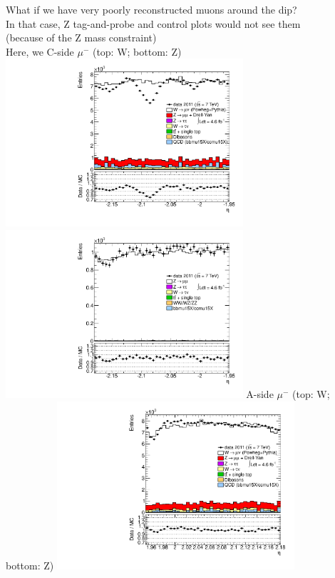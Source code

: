  {
What if we have very poorly reconstructed muons around the dip? \\
In that case, Z tag-and-probe and control plots would not see them \\
(because of the Z mass constraint) \\
Here, we 
}
 {
\colb[T]
C-side $\mu^{-}$ (top: W; bottom: Z)
\centering
\includegraphics[width=0.66\textwidth]{dates/20130306/figures/etaphi/W_10_C_stack_l_eta_NEG} \\
\includegraphics[width=0.66\textwidth]{dates/20130306/figures/etaphi/Znowind_10_C_stack_lN_eta_ALL.pdf}
A-side $\mu^{-}$ (top: W; bottom: Z)
\centering
\includegraphics[width=0.66\textwidth]{dates/20130306/figures/etaphi/W_10_A_stack_l_eta_NEG} \\
}
